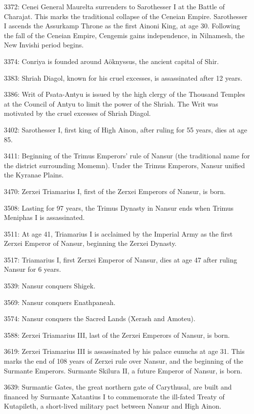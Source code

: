 \documentclass[]{book}
\begin{document}
3372: Cenei General Maurelta surrenders to Sarothesser I at the Battle of Charajat.
This marks the traditional collapse of the Ceneian Empire. Sarothesser I
ascends the Assurkamp Throne as the first Ainoni King, at age 30. Following
the fall of the Ceneian Empire, Cengemis gains independence, in Nilnamesh,
the New Invishi period begins.

3374: Conriya is founded around Aöknyssus, the ancient capital of Shir.

3383: Shriah Diagol, known for his cruel excesses, is assassinated after 12 years.

3386: Writ of Psata-Antyu is issued by the high clergy of the Thousand Temples at the
Council of Antyu to limit the power of the Shriah. The Writ was motivated by
the cruel excesses of Shriah Diagol.

3402: Sarothesser I, first king of High Ainon, after ruling for 55 years, dies at age 85.

3411: Beginning of the Trimus Emperors' rule of Nansur (the traditional name for the
district surrounding Momemn). Under the Trimus Emperors, Nansur unified
the Kyranae Plains.

3470: Zerxei Triamarius I, first of the Zerxei Emperors of Nansur, is born.

3508: Lasting for 97 years, the Trimus Dynasty in Nansur ends when Trimus
Meniphas I is assassinated.

3511: At age 41, Triamarius I is acclaimed by the Imperial Army as the
first Zerxei Emperor of Nansur, beginning the Zerxei Dynasty.

3517: Triamarius I, first Zerxei Emperor of Nansur, dies at age 47 after ruling Nansur
for 6 years.

3539: Nansur conquers Shigek.

3569: Nansur conquers Enathpaneah.

3574: Nansur conquers the Sacred Lands (Xerash and Amoteu).

3588: Zerxei Triamarius III, last of the Zerxei Emperors of Nansur, is born.

3619: Zerxei Triamarius III is assassinated by his palace eunuchs at age 31. This marks
the end of 108 years of Zerxei rule over Nansur, and the beginning of the Surmante Emperors. Surmante Skilura II, a future Emperor of Nansur, is born.

3639: Surmantic Gates, the great northern gate of Carythusal, are built and financed
by Surmante Xatantius I to commemorate the ill-fated Treaty of Kutapileth, a
short-lived military pact between Nansur and High Ainon.
\end{document}
